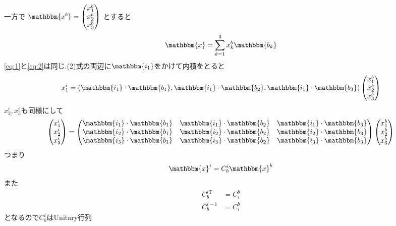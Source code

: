 \documentclass[class=article, crop=false, preview=false, dvipdfmx, a4paper]{standalone}
\begin{document}
一方で
$\mathbbm{x^b}=
    \begin{pmatrix}
    	x^b_1\\
        x^b_2\\
        x^b_3\\
    \end{pmatrix}$
とすると
\begin{equation}
\mathbbm{x} = \sum_{k=1}^{3} x^b_k \mathbbm{b_k}  \label{eq:2}
\end{equation}
\eqref{eq:1}と\eqref{eq:2}は同じ.(2)式の両辺に$\mathbbm{i_1}$をかけて内積をとると
\[ x^i_1 =
	\left(
		\mathbbm{i_1} \cdot \mathbbm{b_1},
        \mathbbm{i_1} \cdot \mathbbm{b_2},
        \mathbbm{i_1} \cdot \mathbbm{b_3}
    \right)
	\begin{pmatrix}
    	x^b_1\\
        x^b_2\\
        x^b_3\\
    \end{pmatrix}
\]
$x^i_2, x^i_3$も同様にして
\[
\begin{pmatrix}
	x^i_1\\
    x^i_2\\
    x^i_3\\
\end{pmatrix}
=
\begin{pmatrix}
	\mathbbm{i_1} \cdot \mathbbm{b_1} & 
    \mathbbm{i_1} \cdot \mathbbm{b_2} & 
    \mathbbm{i_1} \cdot \mathbbm{b_3} \\
    \mathbbm{i_2} \cdot \mathbbm{b_1} &
    \mathbbm{i_2} \cdot \mathbbm{b_2} &
    \mathbbm{i_2} \cdot \mathbbm{b_3} \\
    \mathbbm{i_3} \cdot \mathbbm{b_1} & 
    \mathbbm{i_3} \cdot \mathbbm{b_2} & 
    \mathbbm{i_3} \cdot \mathbbm{b_3}
\end{pmatrix}
\begin{pmatrix}
	x^b_1\\
    x^b_2\\
    x^b_3\\
\end{pmatrix}
\]
つまり
\[ \mathbbm{x}^i = C^i_b\mathbbm{x}^b\]
また
\begin{align}
C_b^{i\mathrm{T}} & = C_i^b \\
C_b^{i-1} & = C^b_i
\end{align}
となるので$C_b^i$はUnitary行列
\end{document}
